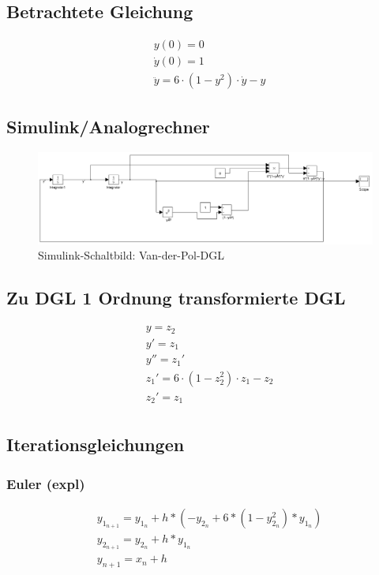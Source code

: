 \documentclass[10pt]{scrartcl}
\begin{document}
	\subsection{Betrachtete Gleichung}
		\begin{align}
		&y(0) = 0\\
		&\dot{y}(0) = 1\\
		&\ddot{y} = 6 \cdot (1-y^2) \cdot \dot{y} -y
		\end{align}

	\subsection{Simulink/Analogrechner}
	\begin{figure}[htbp]
	\centering
		\includegraphics[scale=0.4]{aufg2_a_simulink}
	\caption{Simulink-Schaltbild: Van-der-Pol-DGL}
	\label{fig:simulinkAufg2}
	\end{figure}	
	
	\subsection{Zu DGL 1 Ordnung transformierte DGL}
		\begin{align}
		&y=z_2\\
		&y'=z_1\\
		&y''=z_1'\\
		&z_1' = 6 \cdot (1-z_2^2) \cdot z_1 - z_2\\
		&z_2' = z_1\\
		\end{align}
		
	\subsection{Iterationsgleichungen}
		\subsubsection{Euler (expl)}	
		\begin{align}
			&y_{1_{n+1}} = y_{1_n}+h*(-y_{2_n}+6*(1-y_{2_n}^{2})*y_{1_n})\\
			&y_{2_{n+1}} = y_{2_n}+h*y_{1_n}\\
			&y_{n+1} = x_{n}+h
		\end{align}
		
\end{document}
